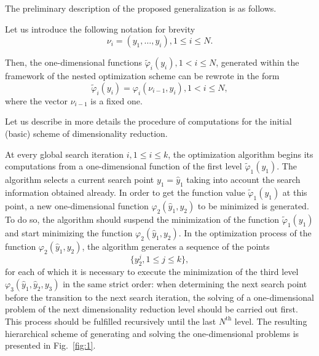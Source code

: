 \documentclass[smallextended]{svjour3}
\let\origref\ref
\renewcommand{\ref}[1]{(\origref{#1})}
\begin{document}
The preliminary description of the proposed generalization is as follows.

Let us introduce the following notation for brevity
\begin{equation}
\label{eq:7}
\nu_i = (y_1, \dots, y_i), 1 \leq i \leq N.
\end{equation}

Then, the one-dimensional functions $\widetilde{\varphi}_i(y_i), 1 < i \leq N$, generated within the framework of the nested optimization scheme can be rewrote in the form
\begin{equation}
\label{eq:8}
\widetilde{\varphi}_i(y_i) = \varphi_i(\nu_{i - 1}, y_i), 1 < i \leq N,
\end{equation}
%
where the vector $\nu_{i - 1}$ is a fixed one.

Let us describe in more details the procedure of computations for the initial (basic) scheme of dimensionality reduction.

At every global search iteration $i, 1 \leq i \leq k$, the optimization algorithm begins its computations from a one-dimensional function of the first level $\widetilde{\varphi}_1(y_1)$. The algorithm selects a current search point $y_1 = \hat{y}_1$ taking into account the search information obtained already. In order to get the function value $\widetilde{\varphi}_1(y_1)$ at this point, a new one-dimensional function $\varphi_2(\hat{y}_1, y_2)$ to be minimized is generated. To do so, the algorithm should suspend the minimization of the function $\widetilde{\varphi}_1(y_1)$ and start minimizing the function $\varphi_2(\hat{y}_1, y_2)$. In the optimization process of the function $\varphi_2(\hat{y}_1, y_2)$, the algorithm generates a sequence of the points
\begin{equation*}
\{ y_2^j, 1 \leq j \leq k \},
\end{equation*}
%
for each of which it is necessary to execute the minimization of the third level $\varphi_3(\hat{y}_1, \hat{y}_2, y_3)$ in the same strict order: when determining the next search point before the transition to the next search iteration, the solving of a one-dimensional problem of the next dimensionality reduction level should be carried out first. This process should be fulfilled recursively until the last $N^{\text{th}}$ level. The resulting hierarchical scheme of generating and solving the one-dimensional problems is presented in Fig.~\origref{fig:1}.
\end{document}
